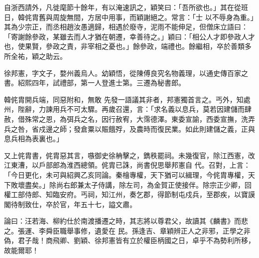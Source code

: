 \begin{pinyinscope}
 自浙西請外，凡徙麾節十餘年，有以淹速訊之，穎笑曰：「吾所欲也。」其在從班日，韓侂胄舊與周旋無間，方居中用事，而穎謝絕之。常言：「士
 以不辱身為重。」其為少宗正，而丞相趙汝愚適歸，相遇於廢寺，泥雨不能伸足，但僧床立語曰：「寄謝餘參政，某雖去而人才猶在朝遷，幸善待之。」穎曰：「相公人才即參政人才也，使果賢，參政之責，非宰相之憂也。」餘參政，端禮也。餘繼相，卒於善類多所全祐，穎之助云。



 徐邦憲，字文子，婺州義烏人。幼穎悟，從陳傅良究名物義理，以通史傳百家之書。紹熙四年，試禮部，第一人登進士第。三遷為秘書郎。



 韓侂胄開兵端，同惡附和，無敢
 先發一語議其非者，邦憲獨首言之。丐外，知處州，陛辭，力諫用兵不可太驟。再歲召還，言：「求名義以息兵，莫若因建儲而肆赦，借殊常之恩，為弭兵之名，因行赦宥，大霈德澤。東委宣諭，西委宣撫，洗弄兵之咎，省戍邊之師；發倉粟以賑餓殍，及農時而復民業。如此則建儲之義，正與息兵相為表裏也。」



 又上侂胄書，侂胄惡其言，嗾御史徐柟擊之，鐫秩罷祠。未幾復官，除江西憲，改江東漕，以戶部郎為淮西總領。侂胄已誅，尚書倪思舉邦憲自
 代。召對，上言：「今日更化，未可與紹興乙亥同論。秦檜專權，天下猶可以緝理，今侂胄專權，天下敗壞盡矣。」除尚右郎兼太子侍講，除左司，為金賀正使接伴。除宗正少卿，回權工部侍郎、知臨安府。丐祠，知江州，奏乞郡，得節制屯戍兵，至郡疾，以寶謨閣待制致仕，卒於官，年五十七，謚文肅。



 論曰：汪若海、柳約仕於南渡播遷之時，其志將以尊君父，故讀其《麟書》而悲之。張運、李舜臣職舉事修，遺愛在
 民。孫逢吉、章穎辨正人之非邪，正學之非偽，君子哉！商飛卿、劉穎、徐邦憲皆有立於權臣柄國之日，卓乎不為勢利所移，故能爾耶！



\end{pinyinscope}